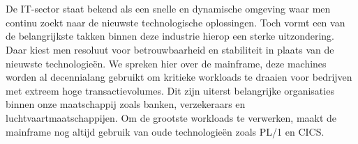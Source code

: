 
\chapter{}%
\label{ch:inleiding}



\section{}%
\label{sec:probleemstelling}

De IT-sector staat bekend als een snelle en dynamische omgeving waar men continu zoekt naar de nieuwste technologische oplossingen. 
Toch vormt een van de belangrijkste takken binnen deze industrie hierop een sterke uitzondering.
Daar kiest men resoluut voor betrouwbaarheid en stabiliteit in plaats van de nieuwste technologieën.
We spreken hier over de mainframe, deze machines worden al decennialang gebruikt om kritieke workloads te draaien voor bedrijven met extreem hoge transactievolumes.
Dit zijn uiterst belangrijke organisaties binnen onze maatschappij zoals banken, verzekeraars en luchtvaartmaatschappijen.
Om de grootste workloads te verwerken, maakt de mainframe nog altijd gebruik van oude technologieën zoals PL/1 en CICS.

